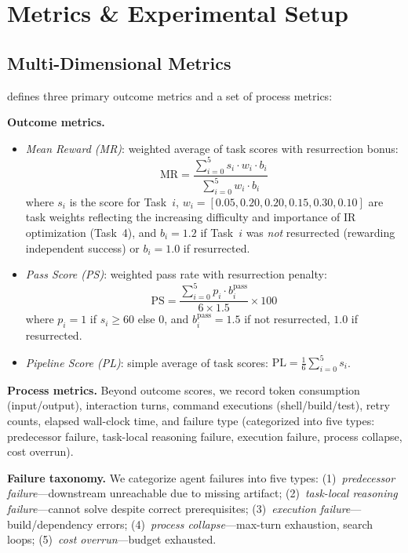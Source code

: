 \section{Metrics \& Experimental Setup}

\subsection{Multi-Dimensional Metrics}

\evobench{} defines three primary outcome metrics and a set of process metrics:

\textbf{Outcome metrics.}
\begin{itemize}[nosep]
\item \emph{Mean Reward (MR)}: weighted average of task scores with resurrection bonus:
\[
\text{MR} = \frac{\sum_{i=0}^{5} s_i \cdot w_i \cdot b_i}{\sum_{i=0}^{5} w_i \cdot b_i}
\]
where $s_i$ is the score for Task~$i$, $w_i = [0.05, 0.20, 0.20, 0.15, 0.30, 0.10]$ are task weights reflecting the increasing difficulty and importance of IR optimization (Task~4), and $b_i = 1.2$ if Task~$i$ was \emph{not} resurrected (rewarding independent success) or $b_i = 1.0$ if resurrected.

\item \emph{Pass Score (PS)}: weighted pass rate with resurrection penalty:
\[
\text{PS} = \frac{\sum_{i=0}^{5} p_i \cdot b_i^{\text{pass}}}{6 \times 1.5} \times 100
\]
where $p_i = 1$ if $s_i \geq 60$ else $0$, and $b_i^{\text{pass}} = 1.5$ if not resurrected, $1.0$ if resurrected.

\item \emph{Pipeline Score (PL)}: simple average of task scores: $\text{PL} = \frac{1}{6}\sum_{i=0}^{5} s_i$.
\end{itemize}

\textbf{Process metrics.}
Beyond outcome scores, we record token consumption (input/output), interaction turns, command executions (shell/build/test), retry counts, elapsed wall-clock time, and failure type (categorized into five types: predecessor failure, task-local reasoning failure, execution failure, process collapse, cost overrun).

\textbf{Failure taxonomy.}
We categorize agent failures into five types:
(1)~\emph{predecessor failure}---downstream unreachable due to missing artifact;
(2)~\emph{task-local reasoning failure}---cannot solve despite correct prerequisites;
(3)~\emph{execution failure}---build/dependency errors;
(4)~\emph{process collapse}---max-turn exhaustion, search loops;
(5)~\emph{cost overrun}---budget exhausted.

